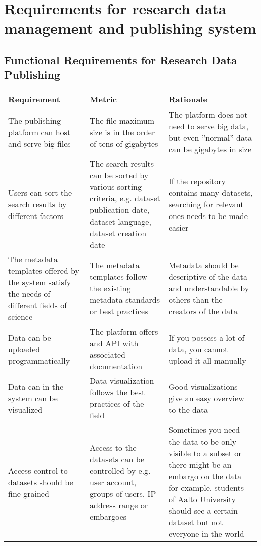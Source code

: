 \chapter{Requirements for research data management and publishing system}
\label{chapter:reqs}

\section{Functional Requirements for Research Data Publishing}

\tabcolsep=0.11cm
\begin{tabularx}{\textwidth}{| >{\raggedright}p{3cm} | >{\raggedright}p{3cm} | X |}
    \hline
    \textbf{Requirement} & \textbf{Metric}& \textbf{Rationale} \\
    \hline
    \rowcolor{Gray}
    The publishing platform can host and serve big files    &The file maximum size is in the order of tens of gigabytes & The platform does not need to serve big data, but even ''normal'' data can be gigabytes in size\\
    \hline
    Users can sort the search results by different factors &The search results can be sorted by various sorting criteria, e.g. dataset publication date, dataset language, dataset creation date & If the repository contains many datasets, searching for relevant ones needs to be made easier\\
    \hline
    \rowcolor{Gray}
    The metadata templates offered by the system satisfy the needs of different fields of science    &The metadata templates follow the existing metadata standards or best practices & Metadata should be descriptive of the data and understandable by others than the creators of the data\\
    \hline
    Data can be uploaded programmatically  &The platform offers and API with associated documentation  & If you possess a lot of data, you cannot upload it all manually\\
    \hline
    \rowcolor{Gray}
    Data can in the system can be visualized        &Data visualization follows the best practices of the field  & Good visualizations give an easy overview to the data\\
    \hline
    Access control to datasets should be fine grained  & Access to the datasets can be controlled by e.g. user account, groups of users, IP address range or embargoes & Sometimes you need the data to be only visible to a subset or there might be an embargo on the data – for example, students of Aalto University should see a certain dataset but not everyone in the world\\

\end{tabularx}
